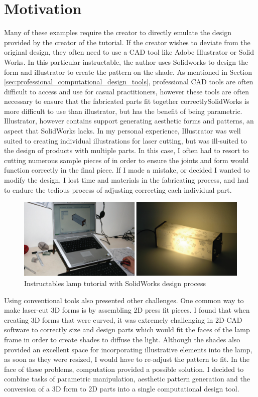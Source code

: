 \section{Motivation}
Many of these examples require the creator to directly emulate the design provided by the creator of the tutorial. If the creator wishes to deviate from the original design, they often need to use a CAD tool like Adobe Illustrator or Solid Works\cite{instructables_lamp}. In this particular instructable, the author uses Solidworks to design the form and illustrator to create the pattern on the shade. As mentioned in Section \ref{sec:professional_computational_design_tools}, professional CAD tools are often difficult to access and use for casual practitioners, however these tools are often necessary to ensure that the fabricated parts fit together correctlySolidWorks is more difficult to use than illustrator, but has the benefit of being parametric. Illustrator, however contains support generating aesthetic forms and patterns, an aspect that SolidWorks lacks. In my personal experience, Illustrator was well suited to creating individual illustrations for laser cutting, but was ill-suited to the design of products with multiple parts. In this case, I often had to resort to cutting numerous sample pieces of in order to ensure the joints and form would function correctly in the final piece. If I made a mistake, or decided I wanted to modify the design, I lost time and materials in the fabricating process, and had to endure the tedious process of adjusting correcting each individual part. 
\begin{center}
\begin{figure}[h!]
\includegraphics[width=6.5in]{images/solidworks_lamp.png}
\caption{Instructables lamp tutorial with SolidWorks design process}
\end{figure}
\end{center}
Using conventional tools also presented other challenges. One common way to make laser-cut 3D forms is by assembling 2D press fit pieces. I found that when creating 3D forms that were curved, it was extremely challenging in 2D-CAD software to correctly size and design parts which would fit the faces of the lamp frame in order to create shades to diffuse the light. Although the shades also provided an excellent space for incorporating illustrative elements into the lamp, as soon as they were resized, I would have to re-adjust the pattern to fit. In the face of these problems, computation provided a possible solution. I decided to combine tasks of parametric manipulation, aesthetic pattern generation and the conversion of a 3D form to 2D parts into a single computational design tool. 
	
